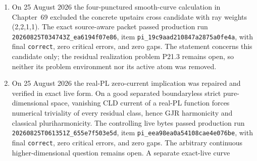 \begin{enumerate}
  \texttt{wrong} because a residue-unit step did not exclude cancellation;
  that run is preserved.  A divisor-support repair passed the second
  \(\mathbf P^2\) run, and the stronger transverse-initial-form proof passed
  generalized production run
  \texttt{20260825T044839Z\_326e2035bbb9}, item
  \texttt{pi\_9e222887262acc5d9fbc740a}, using
  \texttt{gpt-5.6-sol} at \texttt{xhigh}, with final \texttt{correct}, zero
  critical errors, and zero gaps.  The frozen statement, proof, and request
  SHA-256 digests are respectively
  \texttt{326e2035bbb9dd6b3d705f085c19d293da2e58b2998f3452b654c2d75d6d42f3},
  \texttt{7c9317bce0cb53b5767eb63e053c4f0e94ab23b88292e17cb481a1cdba914585},
  and
  \texttt{d186c1e5b96ebb91370a15155b5d6b8f4e355b04740db69bd4ccf60b1ed0b2f7}.
  The adapted exact-live theorem and proof then passed production run
  \texttt{20260825T051642Z\_049da6197deb}, item
  \texttt{pi\_062d99c623958fae25885125}, with the same clean verdict; their
  SHA-256 digests are
  \texttt{049da6197deb627f55e5e469a246dce53154e121eb0a1b8206806ae8ec395518}
  and
  \texttt{d6e40fa3adedaccecc6a3af1f7258ee29b803ac9443a430e234be2a9571c9aa1}.
  The fixed-dual-complex positive theorem remains valid because the moving
  centres escape every one fixed model complex.  Retiring this problem
  leaves 18 formal open environments and 59 active atoms book-wide.  No
  novelty or priority claim is made.
\item On 25 August 2026 the four-punctured smooth-curve calculation in
  Chapter~69 excluded the concrete upstairs cross candidate with ray weights
  (2,2,1,1).  The exact source-aware packet passed production run
  \texttt{20260825T034743Z\_ea6194f07e86}, item
  \texttt{pi\_19c9aad210847a2875a0fe4a}, with final \texttt{correct}, zero
  critical errors, and zero gaps.  The statement concerns this candidate
  only; the residual realization problem P21.3 remains open, so neither its
  problem environment nor its active atom was removed.
\item On 25 August 2026 the real-PL zero-current implication was repaired and
  verified in exact live form.  On a good separated boundaryless strict
  pure-dimensional space, vanishing CLD current of a real-PL function forces
  numerical triviality of every residual class, hence GJR harmonicity and
  classical pluriharmonicity.  The controlling live bytes passed production
  run \texttt{20260825T061351Z\_655e7f503e5d}, item
  \texttt{pi\_eea98ea0a54108cae4e076be}, with final \texttt{correct}, zero
  critical errors, and zero gaps.  The arbitrary continuous
  higher-dimensional question remains open.  A separate exact-live curve

\end{enumerate}
